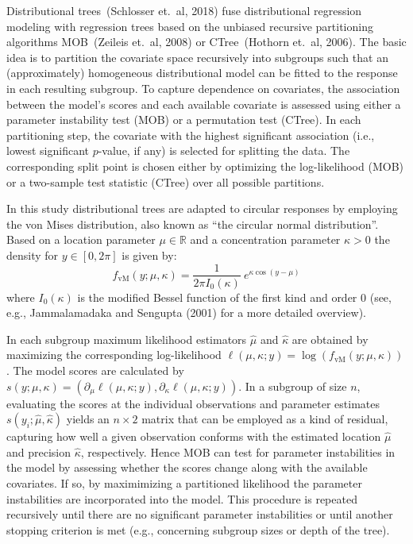 \documentclass[twoside]{report}
\begin{document}
Distributional trees~(Schlosser et.~al, 2018) fuse distributional regression modeling with
regression trees based on the unbiased recursive partitioning algorithms MOB~(Zeileis et.~al, 2008)
or CTree~(Hothorn et.~al, 2006). The basic idea is to partition the covariate space recursively into 
subgroups such that an (approximately) homogeneous distributional model can be fitted to the response 
in each resulting subgroup.
To capture dependence on covariates, the association between the model's scores and each available
covariate is assessed using either a parameter instability test (MOB) or a permutation test (CTree).
In each partitioning step, the covariate with the highest significant association (i.e., lowest
significant $p$-value, if any) is selected for splitting the data. The corresponding split point
is chosen either by optimizing the log-likelihood (MOB) or a two-sample test statistic (CTree)
over all possible partitions.

In this study distributional trees are adapted to circular responses by employing the von Mises
distribution, also known as ``the circular normal distribution''. Based on a location parameter
$\mu \in \mathbb{R}$ and a concentration parameter $\kappa > 0$ the density for $y \in [0, 2 \pi]$
is given by:
\begin{equation}
  f_\mathrm{vM}(y; \mu, \kappa) = \frac{1}{2 \pi I_0(\kappa)}~e^{ \kappa \cos(y - \mu)}\label{equ:vm}
\end{equation}
where $I_0(\kappa)$ is the modified Bessel function of the first kind and order $0$
(see, e.g., Jammalamadaka and Sengupta (2001) for a more detailed overview).

In each subgroup maximum likelihood estimators $\hat \mu$ and $\hat \kappa$ are obtained
by maximizing the corresponding log-likelihood $\ell(\mu, \kappa; y) = \log(f_\mathrm{vM}(y;\mu, \kappa))$. 
The model scores are calculated by  $s(y; \mu, \kappa) = (\partial_{\mu} \ell(\mu, \kappa; y),
\partial_{\kappa} \ell(\mu, \kappa; y))$. In a subgroup of size $n$, evaluating the scores
at the individual observations and parameter estimates $s(y_i; \hat{\mu}, \hat{\kappa})$
yields an $n \times 2$ matrix that can be employed as a kind of residual, capturing how well
a given observation conforms with the estimated location $\hat{\mu}$ and precision $\hat{\kappa}$, 
respectively.
Hence MOB can test for parameter instabilities in the model by assessing whether the scores
change along with the available covariates. If so, by maximimizing a partitioned likelihood
the parameter instabilities are incorporated into the model. This procedure is repeated recursively
until there are no significant parameter instabilities or until another stopping criterion
is met (e.g., concerning subgroup sizes or depth of the tree).
\end{document}
